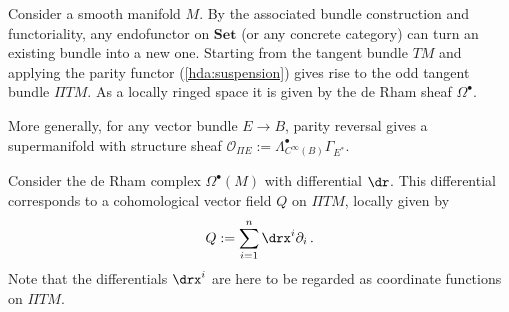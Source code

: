     \begin{example}\label{hdg:odd_tangent_bundle}
        Consider a smooth manifold $M$. By the associated bundle construction and functoriality, any endofunctor on $\mathbf{Set}$ (or any concrete category) can turn an existing bundle into a new one. Starting from the tangent bundle $TM$ and applying the parity functor (\cref{hda:suspension}) gives rise to the odd tangent bundle $\Pi TM$. As a locally ringed space it is given by the de Rham sheaf $\Omega^\bullet$.

        More generally, for any vector bundle $E\rightarrow B$, parity reversal gives a supermanifold with structure sheaf $\mathcal{O}_{\Pi E}:=\Lambda^\bullet_{C^\infty(B)}\Gamma_{E^*}$.
    \end{example}


    \begin{example}
        Consider the de Rham complex $\Omega^\bullet(M)$ with differential $\dr$. This differential corresponds to a cohomological vector field $Q$ on $\Pi TM$, locally given by
        \begin{gather}
            Q := \sum_{i=1}^n\drx^i\partial_i\,.
        \end{gather}
        Note that the differentials $\drx^i$ are here to be regarded as coordinate functions on $\Pi TM$.
    \end{example}


